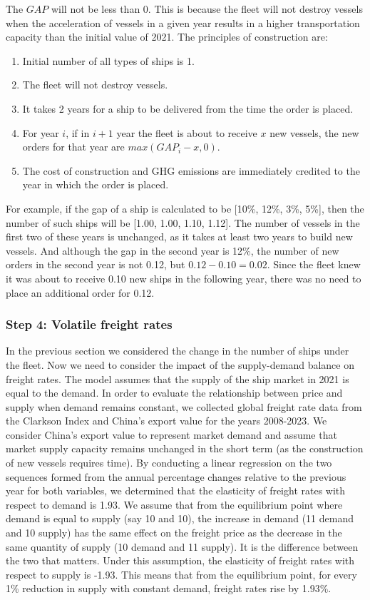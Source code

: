 \documentclass[a4paper,12pt]{article}
\begin{document}
The $GAP$ will not be less than 0.
This is because the fleet will not destroy vessels when the acceleration of vessels in a given year results in a higher transportation capacity than the initial value of 2021.
The principles of construction are:
\begin{enumerate}
	\item Initial number of all types of ships is 1.
	\item The fleet will not destroy vessels.
	\item It takes 2 years for a ship to be delivered from the time the order is placed.
	\item For year $i$, if in $i+1$ year the fleet is about to receive $x$ new vessels, the new orders for that year are $max(GAP_i - x, 0)$.
	\item The cost of construction and GHG emissions are immediately credited to the year in which the order is placed.
\end{enumerate}


For example, if the gap of a ship is calculated to be [10\%, 12\%, 3\%, 5\%], then the number of such ships will be [1.00, 1.00, 1.10, 1.12].
The number of vessels in the first two of these years is unchanged, as it takes at least two years to build new vessels.
And although the gap in the second year is 12\%, the number of new orders in the second year is not 0.12, but $0.12-0.10=0.02$.
Since the fleet knew it was about to receive 0.10 new ships in the following year, there was no need to place an additional order for 0.12.

\subsubsection{Step 4: Volatile freight rates}
In the previous section we considered the change in the number of ships under the fleet.
Now we need to consider the impact of the supply-demand balance on freight rates.
The model assumes that the supply of the ship market in 2021 is equal to the demand.
In order to evaluate the relationship between price and supply when demand remains constant, we collected global freight rate data from the Clarkson Index and China's export value for the years 2008-2023.
We consider China's export value to represent market demand and assume that market supply capacity remains unchanged in the short term (as the construction of new vessels requires time).
By conducting a linear regression on the two sequences formed from the annual percentage changes relative to the previous year for both variables, we determined that the elasticity of freight rates with respect to demand is 1.93.
We assume that from the equilibrium point where demand is equal to supply (say 10 and 10), the increase in demand (11 demand and 10 supply) has the same effect on the freight price as the decrease in the same quantity of supply (10 demand and 11 supply).  
It is the difference between the two that matters.
Under this assumption, the elasticity of freight rates with respect to supply is -1.93.
This means that from the equilibrium point, for every 1\% reduction in supply with constant demand, freight rates rise by 1.93\%.\\
\end{document}
